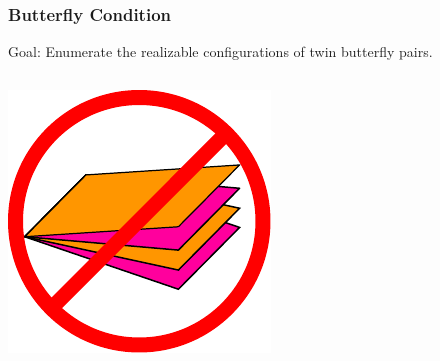\documentclass{beamer}
\begin{document}

\begin{frame}
\frametitle{Butterfly Condition}

\begin{block}{Goal:}
Enumerate the realizable configurations of twin butterfly pairs.
\end{block}

\bigskip

\begin{columns}[c]
\includegraphics[width=\textwidth]{sam_images/bad-butterfly.pdf}

\end{columns}

\end{frame}

\end{document}
